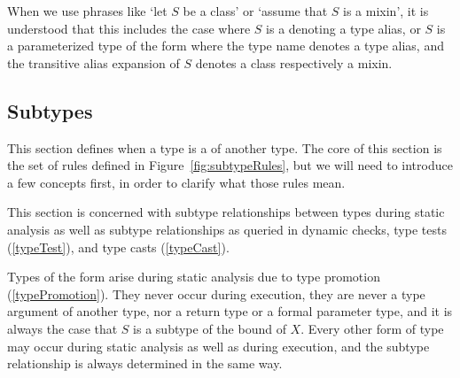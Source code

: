 \documentclass[makeidx]{article}
\begin{document}
{\LMHash{}%
When we use phrases like `let $S$ be a class' or `assume that $S$ is a mixin',
it is understood that this includes the case where
$S$ is a  denoting a type alias, or
$S$ is a parameterized type of the form
where the type name denotes a type alias,
and the transitive alias expansion of $S$ denotes a class respectively a mixin.


\subsection{Subtypes}

\LMHash{}%
This section defines when a type is a  of another type.
The core of this section is the set of rules defined in
Figure~\ref{fig:subtypeRules},
but we will need to introduce a few concepts first,
in order to clarify what those rules mean.


\LMHash{}%
This section is concerned with subtype relationships between types
during static analysis
as well as subtype relationships as queried in dynamic checks,
type tests
(\ref{typeTest}),
and type casts
(\ref{typeCast}).


\LMHash{}%
Types of the form
%
arise during static analysis due to type promotion
(\ref{typePromotion}).
They never occur during execution,
they are never a type argument of another type,
nor a return type or a formal parameter type,
and it is always the case that $S$ is a subtype of the bound of $X$.
Every other form of type may occur during static analysis
as well as during execution,
and the subtype relationship is always determined in the same way.

}
\end{document}

